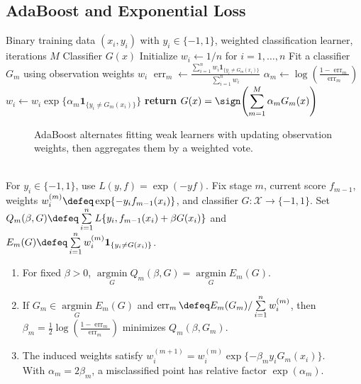 \subsection{AdaBoost and Exponential Loss}
\begin{breakablealgorithm}
\caption{AdaBoost.M1}
\label{alg:sl-adaboost-m1}
\begin{algorithmic}
\Require Binary training data $(x_i,y_i)$ with $y_i\in\{-1,1\}$, weighted classification learner, iterations $M$
\Ensure Classifier $G(x)$
\State Initialize $w_i\gets 1/n$ for $i=1,\ldots,n$
\State Fit a classifier $G_m$ using observation weights $w_i$
\State $\displaystyle \operatorname{err}_m\gets
\frac{\sum_{i=1}^n w_i\mathbf{1}_{\{y_i\neq G_m(x_i)\}}}{\sum_{i=1}^n w_i}$
\State $\displaystyle \alpha_m\gets \log\!\left(\frac{1-\operatorname{err}_m}{\operatorname{err}_m}\right)$
\State $w_i\gets w_i\exp\{\alpha_m\mathbf{1}_{\{y_i\neq G_m(x_i)\}}\}$
\EndFor
\EndFor
\State \textbf{return} $\displaystyle G(x)=\sign\!\left(\sum_{m=1}^M\alpha_mG_m(x)\right)$
\end{algorithmic}
\end{breakablealgorithm}

\begin{figure}[H]
\centering

\caption{AdaBoost alternates \textcolor{blue!70!black}{fitting weak learners} with \textcolor{red!65!black}{updating observation weights}, then \textcolor{orange!80!black}{aggregates} them by a weighted vote.}
\label{fig:sl-adaboost-weighted-samples}
\end{figure}

\begin{proposition} \label{prop:sl-adaboost-exponential-stagewise} \\
For $y_i\in\{-1,1\}$, use $L(y,f)=\exp(-yf)$.  Fix stage $m$, current score $f_{m-1}$, weights $w_i^{(m)}\defeq\exp\{-y_if_{m-1}(x_i)\}$, and classifier $G:\mathcal X\to\{-1,1\}$.  Set $Q_m(\beta,G)\defeq\sum\limits_{i=1}^n L\{y_i,f_{m-1}(x_i)+\beta G(x_i)\}$ and $E_m(G)\defeq\sum\limits_{i=1}^n w_i^{(m)}\mathbf{1}_{\{y_i\neq G(x_i)\}}$.
\begin{enumerate}[label=(\roman*)]
\setlength{\itemsep}{0pt}
\item For fixed $\beta>0$, $\operatorname*{argmin}\limits_G Q_m(\beta,G)=\operatorname*{argmin}\limits_G E_m(G)$.
\item If $G_m\in\operatorname*{argmin}\limits_G E_m(G)$ and $\operatorname{err}_m\defeq E_m(G_m)/\sum\limits_{i=1}^n w_i^{(m)}$, then $\beta_m=\frac12\log\!\left(\frac{1-\operatorname{err}_m}{\operatorname{err}_m}\right)$ minimizes $Q_m(\beta,G_m)$.
\item The induced weights satisfy $w_i^{(m+1)}=w_i^{(m)}\exp\{-\beta_my_iG_m(x_i)\}$.\\
With $\alpha_m=2\beta_m$, a misclassified point has relative factor $\exp(\alpha_m)$.
\end{enumerate}
\end{proposition}

